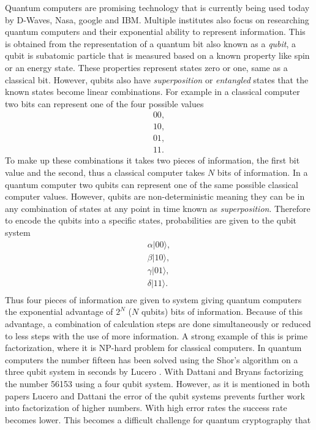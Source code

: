 Quantum computers are promising technology that is currently being used today by D-Waves, Nasa, google and IBM. Multiple institutes also focus on researching quantum computers and their exponential ability to represent information. This is obtained from the representation of a quantum bit also known as a \textit{qubit}, a qubit is subatomic particle that is measured based on a known property like spin or an energy state. These properties represent states zero or one, same as a
classical bit. However, qubits also have \textit{superposition} or \textit{entangled} states that the known states become linear combinations. For example in a classical computer two bits can represent one of the four possible values
\begin{align}
    00,\\
    10,\\
    01,\\
    11.
\end{align}
To make up these combinations it takes two pieces of information, the first bit value and the second, thus a classical computer takes $N$ bits of information. In a quantum computer two qubits can represent one of the same possible classical computer values. However, qubits are non-deterministic meaning they can be in any combination of states at any point in time known as \textit{superposition}. Therefore to encode the qubits into a specific states, probabilities are
given to the qubit system 
\begin{align}
    \alpha |00 \rangle,\\
    \beta  |10 \rangle,\\
    \gamma |01 \rangle,\\
    \delta |11 \rangle.\\
\end{align}
Thus four pieces of information are given to system giving quantum computers the exponential advantage of $2^N$ ($N$ qubits) bits of information. Because of this advantage, a combination of calculation steps are done simultaneously or reduced to less steps with the use of more information. A strong example of this is prime factorization, where it is NP-hard problem for classical computers. In quantum computers the number fifteen has been solved using the Shor's algorithm
on a three qubit system in seconds by Lucero \cite{Lucero2013}. With Dattani and Bryans \cite{Dattani2014} factorizing the number 56153 using a four qubit system. However, as it is mentioned in both papers Lucero \cite{Lucero2013} and Dattani \cite{Dattani2014} the error of the qubit systems prevents further work into factorization of higher numbers. With high error rates the success rate becomes lower. This becomes a difficult challenge for quantum cryptography that
